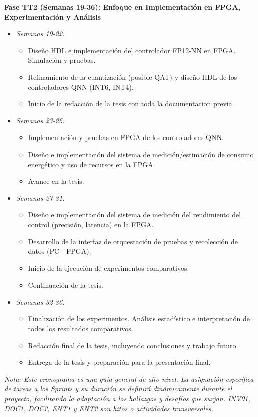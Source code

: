 \documentclass[12pt]{article}
\begin{document}
\textbf{Fase TT2 (Semanas 19-36): Enfoque en Implementación en FPGA, Experimentación y Análisis}
\begin{itemize}
    \item \textit{Semanas 19-22:}
        \begin{itemize}
            \item [EP04] Diseño HDL e implementación del controlador FP12-NN en FPGA. Simulación y pruebas.
            \item [EP05/EP06] Refinamiento de la cuantización (posible QAT) y diseño HDL de los controladores QNN (INT6, INT4).
            \item [DOC2] Inicio de la redacción de la tesis con toda la documentacion previa.
        \end{itemize}
    \item \textit{Semanas 23-26:}
        \begin{itemize}
            \item [EP06] Implementación y pruebas en FPGA de los controladores QNN.
            \item [EP07] Diseño e implementación del sistema de medición/estimación de consumo energético y uso de recursos en la FPGA.
            \item [DOC2] Avance en la tesis.
        \end{itemize}
    \item \textit{Semanas 27-31:}
        \begin{itemize}
            \item [EP08] Diseño e implementación del sistema de medición del rendimiento del control (precisión, latencia) en la FPGA.
            \item [EP09] Desarrollo de la interfaz de orquestación de pruebas y recolección de datos (PC - FPGA).
            \item [EP10] Inicio de la ejecución de experimentos comparativos.
            \item [DOC2] Continuación de la tesis.
        \end{itemize}
    \item \textit{Semanas 32-36:}
        \begin{itemize}
            \item [EP10] Finalización de los experimentos. Análisis estadístico e interpretación de todos los resultados comparativos.
            \item [DOC2] Redacción final de la tesis, incluyendo conclusiones y trabajo futuro.
            \item [ENT2] Entrega de la tesis y preparación para la presentación final.
        \end{itemize}
\end{itemize}
\textit{Nota: Este cronograma es una guía general de alto nivel. La asignación específica de tareas a los \textit{Sprints} y su duración se definirá dinámicamente durante el proyecto, facilitando la adaptación a los hallazgos y desafíos que surjan. INV01, DOC1, DOC2, ENT1 y ENT2 son hitos o actividades transversales.}

\newpage
{}
\end{document}
